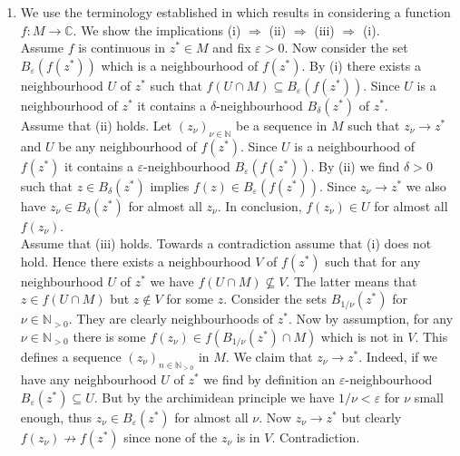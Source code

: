 \begin{enumerate}[label = \textbf{Exercise \arabic*.},wide = 0pt, itemsep=1.5ex]
\begin{proof}
	Towards a contradiction assume that $(X,\mathcal{Z})$ is Hausdorff. Hence for any $p,q \in X$ we find (open) neighbourhoods $U$ of $p$ and $V$ of $q$ such that $U \cap V = \varnothing$. Thus $U^c$ is finite and since $U \cap V = \varnothing$ we have that $U \subseteq V^c$ and thus $U$ is finite. But this would imply that 
	\begin{equation*}
		X = U \cup U^c
	\end{equation*}
	\noindent is the union of finite sets which would mean that $X$ itself is finite. Contradiction.
\end{proof}

\item We use the terminology established in \cite[8--16]{fischer2005funktionentheorie} which results in considering a function $f: M \to \mathbb{C}$. We show the implications (i) $\Rightarrow$ (ii) $\Rightarrow$ (iii) $\Rightarrow$ (i).\\
	Assume $f$ is continuous in $z^* \in M$ and fix $\varepsilon > 0$. Now consider the set $B_\varepsilon(f(z^*))$ which is a neighbourhood of $f(z^*)$. By (i) there exists a neighbourhood $U$ of $z^*$ such that $f(U \cap M) \subseteq B_\varepsilon(f(z^*))$. Since $U$ is a neighbourhood of $z^*$ it contains a $\delta$-neighbourhood $B_\delta(z^*)$ of $z^*$.\\
	Assume that (ii) holds. Let $(z_\nu)_{\nu \in \mathbb{N}}$ be a sequence in $M$ such that $z_\nu \to z^*$ and $U$ be any neighbourhood of $f(z^*)$. Since $U$ is a neighbourhood of $f(z^*)$ it contains a $\varepsilon$-neighbourhood $B_\varepsilon(f(z^*))$. By (ii) we find $\delta > 0$ such that $z \in B_\delta(z^*)$ implies $f(z) \in B_\varepsilon(f(z^*))$. Since $z_\nu \to z^*$ we also have $z_\nu \in B_\delta(z^*)$ for almost all $z_\nu$. In conclusion, $f(z_\nu) \in U$ for almost all $f(z_\nu)$.\\ 
	Assume that (iii) holds. Towards a contradiction assume that (i) does not hold. Hence there exists a neighbourhood $V$ of $f(z^*)$ such that for any neighbourhood $U$ of $z^*$ we have $f(U \cap M) \not\subseteq V$. The latter means that $z \in f(U \cap M)$ but $z \notin V$ for some $z$. Consider the sets $B_{1/\nu}(z^*)$ for $\nu \in \mathbb{N}_{>0}$. They are clearly neighbourhoods of $z^*$. Now by assumption, for any $\nu \in \mathbb{N}_{>0}$ there is some $f(z_\nu) \in f(B_{1/\nu}(z^*) \cap M)$ which is not in $V$. This defines a sequence $(z_\nu)_{n \in \mathbb{N}_{>0}}$ in $M$. We claim that $z_\nu \to z^*$. Indeed, if we have any neighbourhood $U$ of $z^*$ we find by definition an $\varepsilon$-neighbourhood $B_\varepsilon(z^*) \subseteq U$. But by the archimidean principle we have  $1/\nu < \varepsilon$ for $\nu$ small enough, thus $z_\nu \in B_\varepsilon(z^*)$ for almost all $\nu$. Now $z_\nu \to z^*$ but clearly $f(z_\nu) \not\to f(z^*)$ since none of the $z_\nu$ is in $V$. Contradiction.  
\end{enumerate}
\printbibliography

